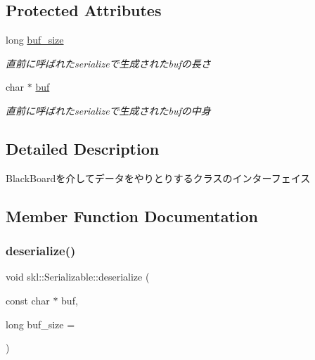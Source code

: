 \subsection*{Protected Attributes}
\begin{DoxyCompactItemize}
\item 
\hypertarget{classskl_1_1_serializable_a087eb19fada917a42b8411bfecbac0f1}{}\label{classskl_1_1_serializable_a087eb19fada917a42b8411bfecbac0f1} 
long \hyperlink{classskl_1_1_serializable_a087eb19fada917a42b8411bfecbac0f1}{buf\+\_\+size}
\begin{DoxyCompactList}\small\item\em 直前に呼ばれたserializeで生成されたbufの長さ \end{DoxyCompactList}\item 
\hypertarget{classskl_1_1_serializable_a1d203d9f0049ce37183a0dcefbc6399a}{}\label{classskl_1_1_serializable_a1d203d9f0049ce37183a0dcefbc6399a} 
char $\ast$ \hyperlink{classskl_1_1_serializable_a1d203d9f0049ce37183a0dcefbc6399a}{buf}
\begin{DoxyCompactList}\small\item\em 直前に呼ばれたserializeで生成されたbufの中身 \end{DoxyCompactList}\end{DoxyCompactItemize}


\subsection{Detailed Description}
Black\+Boardを介してデータをやりとりするクラスのインターフェイス 

\subsection{Member Function Documentation}
\hypertarget{classskl_1_1_serializable_a09f2101bdae407e65e83a286f76cd65f}{}\label{classskl_1_1_serializable_a09f2101bdae407e65e83a286f76cd65f} 
\subsubsection{\texorpdfstring{deserialize()}{deserialize()}}
{\footnotesize\ttfamily void skl\+::\+Serializable\+::deserialize (\begin{DoxyParamCaption}\item[{const char $\ast$}]{buf,  }\item[{long}]{buf\+\_\+size = {} }\end{DoxyParamCaption})\hspace{0.3cm}{\ttfamily [virtual]}}



